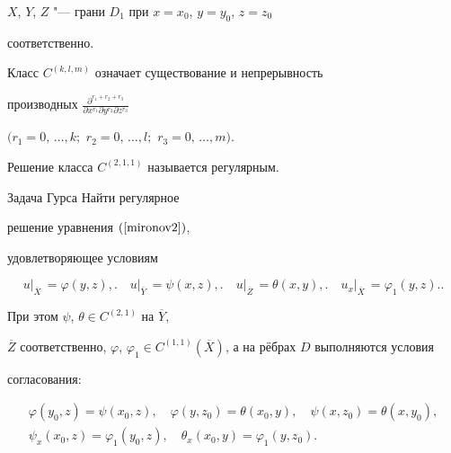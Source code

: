 $X$, $Y$, $Z$ "--- грани $D_1$ при $x=x_{0}$, $y=y_{0}$, \mbox{$z=z_{0}$}


соответственно.


Класс $C^{(k,l,m)}$ означает существование и непрерывность


производных $\frac{\partial^{r_1+r_2+r_3}}


{\partial x^{r_1} \partial y^{r_2} \partial z^{r_3}}$


$(r_1=0,\,\dots,k;$ $r_2=0,\,\dots,l;$ $r_3=0,\,\dots,m).$


Решение класса $C^{(2,1,1)}$ называется регулярным.





\begin{newthm}{Задача Гурса} Найти регулярное


решение уравнения $(\ref{mironov2})$,


удовлетворяющее условиям


\begin{equation*}


u\bigl\vert_{\overline{X}}\, = \varphi(y,z),\bigr. \quad


u\bigl\vert_{\overline{Y}}\, = \psi(x,z),\bigr. \quad


u\bigl\vert_{\overline{Z}}\, = \theta(x,y),\bigr. \quad


u_{x}\bigl\vert_{\overline{X}}\, = \varphi_{1}(y,z).\bigr.


\end{equation*}


При этом  $\psi$, $\theta\in C^{(2,1)}$ на $\overline{Y}$,


$\overline{Z}$ соответственно, $\varphi$, $\varphi_{1}\in


C^{(1,1)}(\overline{X})$, а на рёбрах $D$ выполняются условия


согласования:


$$


\begin{array}{c}


\varphi(y_{0}, z)=\psi(x_{0}, z), \quad


\varphi(y,z_{0})=\theta(x_{0}, y), \quad


\psi(x,z_{0})=\theta(x,y_{0}),\\


\psi_{x}(x_0,z)=\varphi_1(y_0,z),\quad


\theta_{x}(x_0,y)=\varphi_{1}(y,z_0).


\end{array}


$$


\end{newthm}





